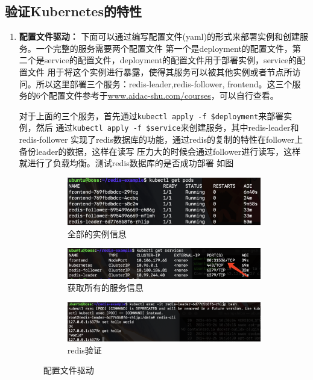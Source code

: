 \documentclass{article}
\begin{document}
\subsection{验证Kubernetes的特性}
\begin{enumerate}
    \item {\textbf{\heiti 配置文件驱动：}}
下面可以通过编写配置文件(yaml)的形式来部署实例和创建服务。一个完整的服务需要两个配置文件
第一个是deployment的配置文件，第二个是service的配置文件，deployment的配置文件用于部署实例，service的配置文件
用于将这个实例进行暴露，使得其服务可以被其他实例或者节点所访问。所以这里部署三个服务：redis-leader,redis-follower,
frontend。这三个服务的6个配置文件参考于\url{www.aidac-shu.com/courses}，可以自行查看。

\quad \quad 对于上面的三个服务，首先通过\texttt{kubectl apply -f \${deployment}}来部署实例，然后
通过\texttt{kubectl apply -f \${service}}来创建服务，其中redis-leader和redis-follower
实现了redis数据库的功能，通过redis的复制的特性在follower上备份leader的数据，这样在读写
压力大的时候会通过follower进行读写，这样就进行了负载均衡。测试redis数据库的是否成功部署
如图

\begin{figure}[H]
    \centering
    \begin{subfigure}[b]{0.45\textwidth}
        \centering
        \includegraphics[width=\textwidth]{podsall.png}
        \caption{全部的实例信息}
        \label{fig:podsall}
    \end{subfigure}
    \hfill
    \begin{subfigure}[b]{0.50\textwidth}
        \centering
        \includegraphics[width=\textwidth]{service1.png}
        \caption{获取所有的服务信息}
        \label{fig:service1}
    \end{subfigure}

    \begin{subfigure}{0.65\textwidth}
        \centering
        \includegraphics[width=\textwidth]{redis.png}
        \caption{redis验证}
        \label{fig:redisve}
    \end{subfigure}
    \caption{配置文件驱动}
\end{figure}


\end{enumerate}
\end{document}
